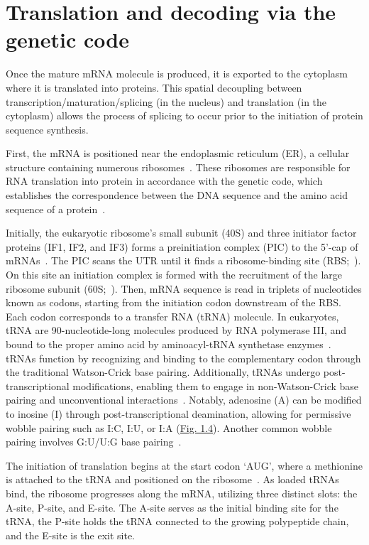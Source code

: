 \section{Translation and decoding via the genetic code}
\label{sec:translationdecoding}
Once the mature \acrshort{mRNA} molecule is produced, it is exported to the cytoplasm where it is translated into proteins. This spatial decoupling between transcription/maturation/splicing (in the nucleus) and translation (in the cytoplasm) allows the process of splicing to occur prior to the initiation of protein sequence synthesis.

First, the \acrshort{mRNA} is positioned near the endoplasmic reticulum (ER), a cellular structure containing numerous ribosomes~\citep{palade_small_1955}. These ribosomes are responsible for \acrshort{RNA} translation into protein in accordance with the genetic code, which establishes the correspondence between the DNA sequence and the amino acid sequence of a protein~\citep{balis_role_1958}. 

Initially, the eukaryotic ribosome's small subunit (40S) and three initiator factor proteins (IF1, IF2, and IF3) forms a preinitiation complex (PIC) to the 5'-cap of \acrshort{mRNA}s~\citep{wang_rapid_2022}. The PIC scans the \acrshort{UTR} until it finds a ribosome-binding site (RBS;~\citet{kozak_scanning_1989}). On this site an initiation complex is formed with the recruitment of the large ribosome subunit (60S;~\citet{blanchet_translation_2022}). Then, \acrshort{mRNA} sequence is read in triplets of nucleotides known as codons, starting from the initiation codon downstream of the RBS. Each codon corresponds to a transfer RNA (\acrshort{tRNA}) molecule. In eukaryotes, tRNA are 90-nucleotide-long molecules produced by RNA polymerase III, and bound to the proper amino acid by aminoacyl-tRNA synthetase enzymes~\citep{sprinzl_-c-c-end_1979}. tRNAs function by recognizing and binding to the complementary codon through the traditional Watson-Crick base pairing. Additionally, tRNAs undergo post-transcriptional modifications, enabling them to engage in non-Watson-Crick base pairing and unconventional interactions~\citep{percudani_restricted_2001}. Notably, adenosine (\acrshort{A}) can be modified to inosine (\acrshort{I}) through post-transcriptional deamination, allowing for permissive wobble pairing such as I:C, I:U, or I:A (\hyperref[fig:pairing]{Fig. 1.4}). Another common wobble pairing involves G:U/U:G base pairing~\citep{percudani_restricted_2001}.

The initiation of translation begins at the start \gls{codon} `AUG', where a methionine is attached to the tRNA and positioned on the ribosome~\citep{tamura_origins_2015}. As loaded \acrshort{tRNA}s bind, the ribosome progresses along the \acrshort{mRNA}, utilizing three distinct slots: the A-site, P-site, and E-site. The A-site serves as the initial binding site for the \acrshort{tRNA}, the P-site holds the \acrshort{tRNA} connected to the growing polypeptide chain, and the E-site is the exit site.

